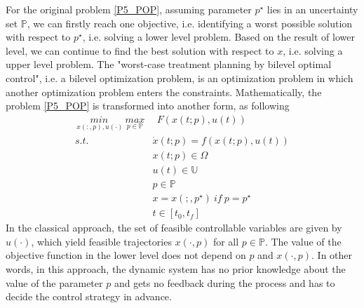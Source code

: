 \documentclass  [
  paper    = a4,
  BCOR     = 10mm,
  twoside,
  fontsize = 12pt,
  fleqn,
  toc      = bibnumbered,
  toc      = listofnumbered,
  numbers  = noendperiod,
  headings = normal,
  listof   = leveldown,
  version  = 3.03
]                                       {scrreprt}
\newcommand{\<}{\langle}
\renewcommand{\>}{\rangle}
\begin{document}
For the original problem \ref{P5_POP}, assuming parameter $p^\star $ lies in an uncertainty set $ \mathbb{P}$, we can firstly reach one objective, i.e. identifying a worst possible solution with respect to $p^\star$, i.e. solving a lower level problem. Based on the result of lower level, we can continue to find the best solution with respect to $x$, i.e. solving a upper level problem. The "worst-case treatment planning by bilevel optimal control", i.e. a  bilevel optimization problem, is an optimization problem in which another optimization problem enters the constraints. Mathematically, the problem \ref{P5_POP} is transformed into another form,  as following
\begin{equation}
	\begin{aligned}
		\underset{\ x(:,p), u(\cdot)}{min} \   \underset{p  \in   \mathbb{P} }{max} & \ \ F(x(t;p), u(t)) \\ 
	s.t.\ \  &  \dot{x} (t;p) = f(x(t;p), u(t))\\ 
& x(t;p) \in \Omega \\
& u(t) \in \mathbb{U}  \\
& p  \in   \mathbb{P}  \\
& x = x(;,p^\star) \ if \ p = p^\star \\
& t \in [t_0, t_f]
	\end{aligned}
	\label{minmax}
\end{equation}
In the classical approach, the set of feasible controllable variables are given by $u(\cdot)$, which yield feasible trajectories $x(\cdot, p)$ for all $p  \in   \mathbb{P}$. The value of the objective function in the lower level does not depend on $p$ and $x(\cdot, p)$. In other words, in this approach, the dynamic system has no prior knowledge about the value of the parameter $p$ and gets no feedback during the process and has to decide the control strategy in advance. 
\end{document}
